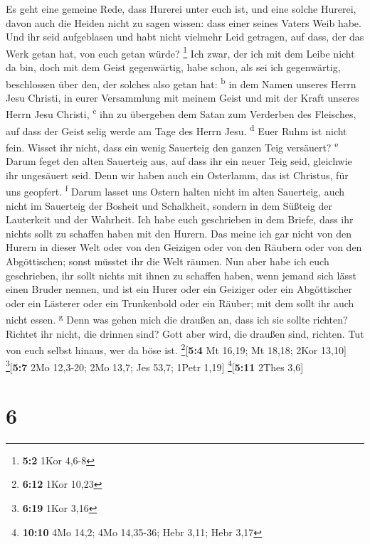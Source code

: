  Es geht eine gemeine Rede, dass Hurerei unter euch ist,
und eine solche Hurerei, davon auch die Heiden nicht zu sagen wissen:
dass einer seines Vaters Weib habe.  Und ihr seid
aufgeblasen und habt nicht vielmehr Leid getragen, auf dass, der das
Werk getan hat, von euch getan würde? \footnote{\textbf{5:2} 1Kor 4,6-8}
 Ich zwar, der ich mit dem Leibe nicht da bin, doch mit
dem Geist gegenwärtig, habe schon, als sei ich gegenwärtig, beschlossen
über den, der solches also getan hat: \textsuperscript{b} 
in dem Namen unseres Herrn Jesu Christi, in eurer Versammlung mit meinem
Geist und mit der Kraft unseres Herrn Jesu Christi, \textsuperscript{c}
 ihn zu übergeben dem Satan zum Verderben des Fleisches,
auf dass der Geist selig werde am Tage des Herrn Jesu.
\textsuperscript{d}  Euer Ruhm ist nicht fein. Wisset ihr
nicht, dass ein wenig Sauerteig den ganzen Teig versäuert?
\textsuperscript{e}  Darum feget den alten Sauerteig aus,
auf dass ihr ein neuer Teig seid, gleichwie ihr ungesäuert seid. Denn
wir haben auch ein Osterlamm, das ist Christus, für uns geopfert.
\textsuperscript{f}  Darum lasset uns Ostern halten nicht
im alten Sauerteig, auch nicht im Sauerteig der Bosheit und Schalkheit,
sondern in dem Süßteig der Lauterkeit und der Wahrheit. 
Ich habe euch geschrieben in dem Briefe, dass ihr nichts sollt zu
schaffen haben mit den Hurern.  Das meine ich gar nicht
von den Hurern in dieser Welt oder von den Geizigen oder von den Räubern
oder von den Abgöttischen; sonst müsstet ihr die Welt räumen.
 Nun aber habe ich euch geschrieben, ihr sollt nichts mit
ihnen zu schaffen haben, wenn jemand sich lässt einen Bruder nennen, und
ist ein Hurer oder ein Geiziger oder ein Abgöttischer oder ein Lästerer
oder ein Trunkenbold oder ein Räuber; mit dem sollt ihr auch nicht
essen. \textsuperscript{g}  Denn was gehen mich die
draußen an, dass ich sie sollte richten? Richtet ihr nicht, die drinnen
sind?  Gott aber wird, die draußen sind, richten. Tut von
euch selbst hinaus, wer da böse ist. \footnote{\textbf{6:12} 1Kor 10,23}{[}\textbf{5:4}
Mt 16,19; Mt 18,18; 2Kor 13,10{]} \footnote{\textbf{6:19} 1Kor 3,16}{[}\textbf{5:7}
2Mo 12,3-20; 2Mo 13,7; Jes 53,7; 1Petr 1,19{]}
\footnote{\textbf{10:10} 4Mo 14,2; 4Mo 14,35-36; Hebr 3,11; Hebr 3,17}{[}\textbf{5:11}
2Thes 3,6{]}

\hypertarget{section-5}{%
\section{6}\label{section-5}}

